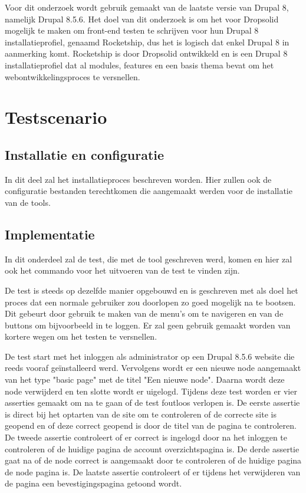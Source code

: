 Voor dit onderzoek wordt gebruik gemaakt van de laatste versie van Drupal 8, namelijk Drupal 8.5.6. Het doel van dit onderzoek is om het voor Dropsolid mogelijk te maken om front-end testen te schrijven voor hun Drupal 8 installatieprofiel, genaamd Rocketship, dus het is logisch dat enkel Drupal 8 in aanmerking komt. Rocketship is door Dropsolid ontwikkeld en is een Drupal 8 installatieprofiel dat al modules, features en een basis thema bevat om het webontwikkelingsproces te versnellen.

\clearpage
\section{Testscenario}
\subsection{Installatie en configuratie}
In dit deel zal het installatieproces beschreven worden. Hier zullen ook de configuratie bestanden terechtkomen die aangemaakt werden voor de installatie van de \glspl{tool}.

\subsection{Implementatie}
In dit onderdeel zal de test, die met de \gls{tool} geschreven werd, komen en hier zal ook het commando voor het uitvoeren van de test te vinden zijn.

De test is steeds op dezelfde manier opgebouwd en is geschreven met als doel het proces dat een normale gebruiker zou doorlopen zo goed mogelijk na te bootsen. Dit gebeurt door gebruik te maken van de menu's om te navigeren en van de buttons om bijvoorbeeld in te loggen. Er zal geen gebruik gemaakt worden van kortere wegen om het testen te versnellen.

De test start met het inloggen als administrator op een Drupal 8.5.6 website die reeds vooraf geïnstalleerd werd. Vervolgens wordt er een nieuwe node aangemaakt van het type "basic page" met de titel "Een nieuwe node". Daarna wordt deze node verwijderd en ten slotte wordt er uigelogd. Tijdens deze test worden er vier \glspl{assertie} gemaakt om na te gaan of de test foutloos verlopen is. De eerste \gls{assertie} is direct bij het optarten van de site om te controleren of de correcte site is geopend en of deze correct geopend is door de titel van de pagina te controleren. De tweede \gls{assertie} controleert of er correct is ingelogd door na het inloggen te controleren of de huidige pagina de account overzichtspagina is. De derde \gls{assertie} gaat na of de node correct is aangemaakt door te controleren of de huidige pagina de node pagina is. De laatste \gls{assertie} controleert of er tijdens het verwijderen van de pagina een bevestigingspagina getoond wordt.
